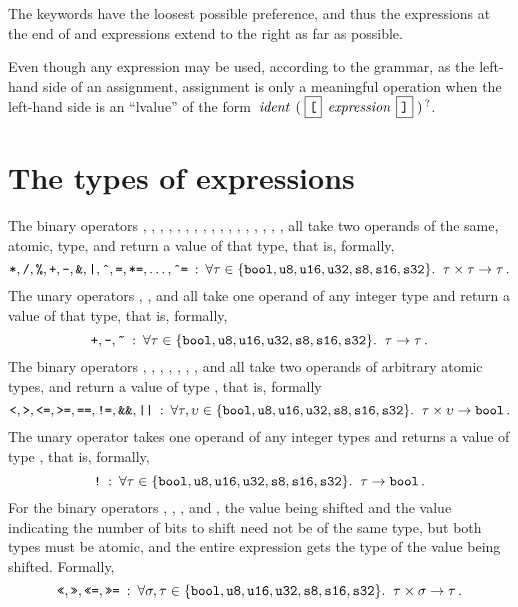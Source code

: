 \documentclass[a4paper,12pt]{scrreprt}
\begin{document}
The keywords have the loosest possible preference, and thus the
expressions at the end of  and  expressions extend
to the right as far as possible.

Even though any expression may be used, according to the grammar, as
the left-hand side of an assignment, assignment is only a meaningful
operation when the left-hand side is an ``lvalue'' of the form
$\id{ident}\grp{\lit{[}\id{expression}\lit{]}}\opt$.

\section{The types of expressions}

The binary operators \code{*}, \code{/}, \code{\%}, \code{+},
\code{-}, \code{\&}, \code{|}, \code{\^{}}, \code{=}, \code{*=},
\code{/=}, \code{\%=}, \code{+=}, \code{-=}, \code{\&=}, \code{|=},
\code{\^{}=}, all take two operands of the same, atomic, type, and
return a value of that type, that is, formally,
\[ \texttt{*}, \texttt{/}, \texttt{\%}, \texttt{+}, \texttt{-}, \texttt{\&},
\texttt{|}, \texttt{\^{}}, \texttt{=}, \texttt{*=}, \ldots, \texttt{\^{}=} 
\::\:
\forall \tau\in\{\texttt{bool}, \texttt{u8}, \texttt{u16}, \texttt{u32},
 \texttt{s8}, \texttt{s16},
 \texttt{s32}\}.\;\;\tau\times\tau\rightarrow\tau\,.\] 
The unary operators \code{+}, \code{-}, and \code{\~{}} all take one
 operand of any integer type and return a value of that type, that is,
 formally,
 \[\texttt{+}, \texttt{-}, \texttt{\~{}} \::\: 
 \forall \tau\in\{\texttt{bool}, \texttt{u8}, \texttt{u16}, \texttt{u32}, \texttt{s8},
 \texttt{s16}, \texttt{s32}\}.\;\;\tau\rightarrow\tau\,.\]
The binary operators \code{<}, \code{>}, \code{<=}, \code{>=},
 \code{==}, \code{!=},
\code{\&\&}, and \code{||} all take two operands of arbitrary atomic
types, and return a value of type , that is, formally
\[ \texttt{<}, \texttt{>}, \texttt{<=}, \texttt{>=},
   \texttt{==}, \texttt{!=},
   \texttt{\&\&}, \texttt{||} \::\:
   \forall \tau,\upsilon\in\{\texttt{bool}, \texttt{u8}, \texttt{u16}, \texttt{u32},
    \texttt{s8}, \texttt{s16},
    \texttt{s32}\}.\;\;\tau\times\upsilon\rightarrow\texttt{bool}\,.\] 
The unary operator \code{!} takes one operand of any integer types and
returns a value of type , that is, formally,
\[ \texttt{!} \::\:
   \forall \tau\in\{\texttt{bool}, \texttt{u8}, \texttt{u16}, \texttt{u32},
    \texttt{s8}, \texttt{s16},
    \texttt{s32}\}.\;\;\tau\rightarrow\texttt{bool}\,.\] For the binary
    operators \code{<<}, \code{>>}, \code{<<=}, and \code{>>=}, the
    value being shifted and the value indicating the number of bits to
    shift need not be of the same type, but both types must be atomic,
    and the entire expression gets the type of the value being
    shifted. Formally,
\[\texttt{<<}, \texttt{>>}, \texttt{<<=}, \texttt{>>=} \::\:
 \forall \sigma,\tau\in\{\texttt{bool}, \texttt{u8}, \texttt{u16}, \texttt{u32},
 \texttt{s8}, \texttt{s16},
 \texttt{s32}\}.\;\;\tau\times\sigma\rightarrow\tau\,.\]
\end{document}

